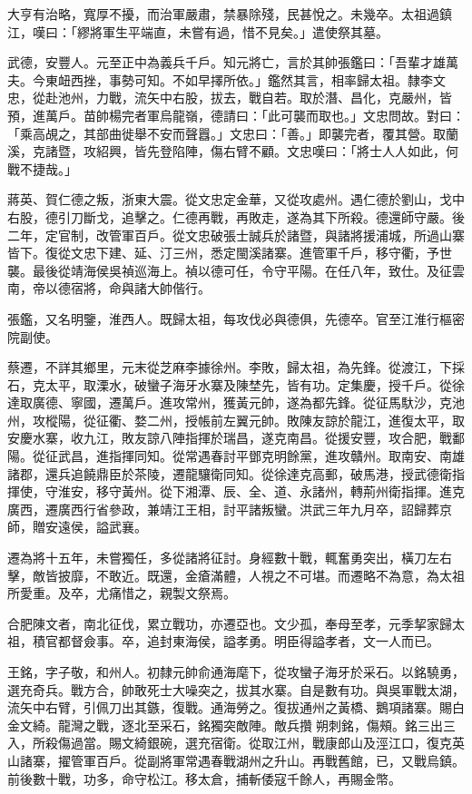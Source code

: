 \begin{pinyinscope}
大亨有治略，寬厚不擾，而治軍嚴肅，禁暴除殘，民甚悅之。未幾卒。太祖過鎮江，嘆曰：「繆將軍生平端直，未嘗有過，惜不見矣。」遣使祭其墓。

武德，安豐人。元至正中為義兵千戶。知元將亡，言於其帥張鑑曰：「吾輩才雄萬夫。今東衄西挫，事勢可知。不如早擇所依。」鑑然其言，相率歸太祖。隸李文忠，從赴池州，力戰，流矢中右股，拔去，戰自若。取於潛、昌化，克嚴州，皆預，進萬戶。苗帥楊完者軍烏龍嶺，德請曰：「此可襲而取也。」文忠問故。對曰：「乘高覘之，其部曲徙舉不安而聲囂。」文忠曰：「善。」即襲完者，覆其營。取蘭溪，克諸暨，攻紹興，皆先登陷陣，傷右臂不顧。文忠嘆曰：「將士人人如此，何戰不捷哉。」

蔣英、賀仁德之叛，浙東大震。從文忠定金華，又從攻處州。遇仁德於劉山，戈中右股，德引刀斷戈，追擊之。仁德再戰，再敗走，遂為其下所殺。德還師守嚴。後二年，定官制，改管軍百戶。從文忠破張士誠兵於諸暨，與諸將援浦城，所過山寨皆下。復從文忠下建、延、汀三州，悉定閩溪諸寨。進管軍千戶，移守衢，予世襲。最後從靖海侯吳禎巡海上。禎以德可任，令守平陽。在任八年，致仕。及征雲南，帝以德宿將，命與諸大帥偕行。

張鑑，又名明鑒，淮西人。既歸太祖，每攻伐必與德俱，先德卒。官至江淮行樞密院副使。

蔡遷，不詳其鄉里，元末從芝麻李據徐州。李敗，歸太祖，為先鋒。從渡江，下採石，克太平，取溧水，破蠻子海牙水寨及陳埜先，皆有功。定集慶，授千戶。從徐達取廣德、寧國，遷萬戶。進攻常州，獲黃元帥，遂為都先鋒。從征馬馱沙，克池州，攻樅陽，從征衢、婺二州，授帳前左翼元帥。敗陳友諒於龍江，進復太平，取安慶水寨，收九江，敗友諒八陣指揮於瑞昌，遂克南昌。從援安豐，攻合肥，戰鄱陽。從征武昌，進指揮同知。從常遇春討平鄧克明餘黨，進攻贛州。取南安、南雄諸郡，還兵追饒鼎臣於茶陵，遷龍驤衛同知。從徐達克高郵，破馬港，授武德衛指揮使，守淮安，移守黃州。從下湘潭、辰、全、道、永諸州，轉荊州衛指揮。進克廣西，遷廣西行省參政，兼靖江王相，討平諸叛蠻。洪武三年九月卒，詔歸葬京師，贈安遠侯，謚武襄。

遷為將十五年，未嘗獨任，多從諸將征討。身經數十戰，輒奮勇突出，橫刀左右擊，敵皆披靡，不敢近。既還，金瘡滿體，人視之不可堪。而遷略不為意，為太祖所愛重。及卒，尤痛惜之，親製文祭焉。

合肥陳文者，南北征伐，累立戰功，亦遷亞也。文少孤，奉母至孝，元季挈家歸太祖，積官都督僉事。卒，追封東海侯，謚孝勇。明臣得謚孝者，文一人而已。

王銘，字子敬，和州人。初隸元帥俞通海麾下，從攻蠻子海牙於采石。以銘驍勇，選充奇兵。戰方合，帥敢死士大噪突之，拔其水寨。自是數有功。與吳軍戰太湖，流矢中右臂，引佩刀出其鏃，復戰。通海勞之。復拔通州之黃橋、鵝項諸寨。賜白金文綺。龍灣之戰，逐北至采石，銘獨突敵陣。敵兵攢朔刺銘，傷頰。銘三出三入，所殺傷過當。賜文綺銀碗，選充宿衛。從取江州，戰康郎山及涇江口，復克英山諸寨，擢管軍百戶。從副將軍常遇春戰湖州之升山。再戰舊館，已，又戰烏鎮。前後數十戰，功多，命守松江。移太倉，捕斬倭寇千餘人，再賜金幣。


\end{pinyinscope}
